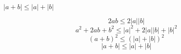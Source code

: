 \documentclass[11pt,largemargins]{homework}
\begin{document}
\maketitle

$|a + b| \leq |a|+|b|$

\[2ab \leq 2|a| |b|\]
\[a^2 + 2ab + b^2 \leq |a|^2 + 2|a| |b| + |b|^2\] 
\[(a + b)^2 \leq (|a| + |b|)^2 \] 
\[|a + b| \leq |a| + |b|\]

\end{document}
